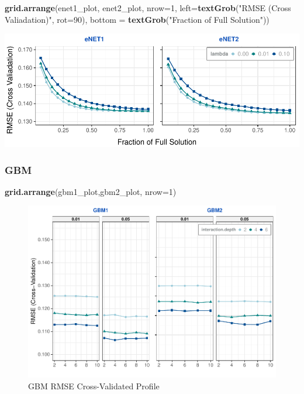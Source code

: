 \documentclass[]{report}
\newenvironment{Shaded}{\begin{snugshade}}{\end{snugshade}}
\newcommand{\DataTypeTok}[1]{\textcolor[rgb]{0.13,0.29,0.53}{#1}}
\newcommand{\DecValTok}[1]{\textcolor[rgb]{0.00,0.00,0.81}{#1}}
\newcommand{\KeywordTok}[1]{\textcolor[rgb]{0.13,0.29,0.53}{\textbf{#1}}}
\newcommand{\NormalTok}[1]{#1}
\newcommand{\StringTok}[1]{\textcolor[rgb]{0.31,0.60,0.02}{#1}}
\begin{document}
\begin{Shaded}
\begin{Highlighting}[]
\KeywordTok{grid.arrange}\NormalTok{(enet1_plot, enet2_plot, }\DataTypeTok{nrow=}\DecValTok{1}\NormalTok{, }\DataTypeTok{left=}\KeywordTok{textGrob}\NormalTok{(}\StringTok{"RMSE (Cross Valiadation)"}\NormalTok{, }\DataTypeTok{rot=}\DecValTok{90}\NormalTok{), }\DataTypeTok{bottom =} \KeywordTok{textGrob}\NormalTok{(}\StringTok{"Fraction of Full Solution"}\NormalTok{))}
\end{Highlighting}
\end{Shaded}

\includegraphics{Proj2-JM_files/figure-latex/unnamed-chunk-8-1.pdf}

\hypertarget{gbm}{%
\subsubsection{GBM}\label{gbm}}

\begin{Shaded}
\begin{Highlighting}[]
\KeywordTok{grid.arrange}\NormalTok{(gbm1_plot,gbm2_plot, }\DataTypeTok{nrow=}\DecValTok{1}\NormalTok{)}
\end{Highlighting}
\end{Shaded}

\begin{figure}
\centering
\includegraphics{Proj2-JM_files/figure-latex/unnamed-chunk-9-1.pdf}
\caption{GBM RMSE Cross-Validated Profile}
\end{figure}
\end{document}
